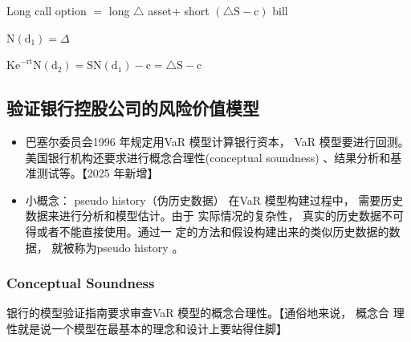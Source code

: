     Long call option \(=\) long \(\bigtriangleup\) asset+ short \(\left( {\bigtriangleup \mathrm{S} - \mathrm{c}}\right)\) bill
    
    \(\mathrm{N}\left( {\mathrm{d}}_{1}\right)  = \Delta\)
    
    \({\mathrm{{Ke}}}^{-\mathrm{{rt}}}\mathrm{N}\left( {\mathrm{d}}_{2}\right)  = \mathrm{{SN}}\left( {\mathrm{d}}_{1}\right)  - \mathrm{c} = \bigtriangleup \mathrm{S} - \mathrm{c}\)
    




\subsection{验证银行控股公司的风险价值模型}

\begin{itemize}
    
    \item 巴塞尔委员会1996 年规定用VaR 模型计算银行资本， VaR 模型要进行回测。
美国银行机构还要求进行概念合理性(conceptual soundness) 、结果分析和基
准测试等。【2025 年新增】
\item 小概念： pseudo history（伪历史数据）
在VaR 模型构建过程中， 需要历史数据来进行分析和模型估计。由于
实际情况的复杂性， 真实的历史数据不可得或者不能直接使用。通过一
定的方法和假设构建出来的类似历史数据的数据， 就被称为pseudo
history 。
\end{itemize}

\subsubsection{Conceptual Soundness}
银行的模型验证指南要求审查VaR 模型的概念合理性。【通俗地来说， 概念合
理性就是说一个模型在最基本的理念和设计上要站得住脚】

